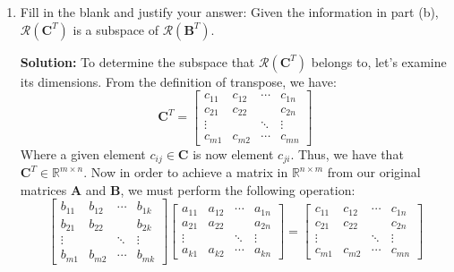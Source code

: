 \begin{enumerate}[label=(\alph*)]
	      \par Together, we have shown that $\mathcal{R}(\mathbf{C})$ is a subspace
	      of $\mathcal{R}(\mathbf{A})$. \qed

	\item Fill in the blank and justify your answer: Given the information in
	      part (b), $\mathcal{R}\left( \mathbf{C}^T \right)$ is a subspace of
	      $\mathcal{R}\left(\mathbf{B}^T \right)$.

	      \par \textbf{Solution:}
	      To determine the subspace that $\mathcal{R}\left( \mathbf{C}^T
		      \right)$ belongs to, let's examine its dimensions. From the definition
	      of transpose, we have:
	      $$
		      \mathbf{C}^T  =
		      \left[\begin{array}{cccc}
				      c_{11}  & c_{12}  & \cdots & c_{1 n} \\
				      c_{21}  & c_{22}  &        & c_{2 n} \\
				      \vdots  &         & \ddots & \vdots  \\
				      c_{m 1} & c_{m 2} & \cdots & c_{m n}
			      \end{array}\right]
	      $$
	      Where a given element $c_{ij} \in \mathbf{C}$ is now element $c_{ji}$.
	      Thus, we have that $\mathbf{C}^T \in \mathbb{R}^{m \times n}$. Now in
	      order to achieve a matrix in $\mathbb{R}^{n \times m}$ from our
	      original matrices $\mathbf{A}$ and $\mathbf{B}$, we must perform the
	      following operation:
	      $$
		      \left[\begin{array}{cccc}
				      b_{11}  & b_{12}  & \cdots & b_{1 k} \\
				      b_{21}  & b_{22}  &        & b_{2 k} \\
				      \vdots  &         & \ddots & \vdots  \\
				      b_{m 1} & b_{m 2} & \cdots & b_{m k}
			      \end{array}\right]
		      \left[\begin{array}{cccc}
				      a_{11}  & a_{12} & \cdots & a_{1 n} \\
				      a_{21}  & a_{22} &        & a_{2 n} \\
				      \vdots  &        & \ddots & \vdots  \\
				      a_{k 1} & a_{k2} & \cdots & a_{k n}
			      \end{array}\right]
		      =
		      \left[\begin{array}{cccc}
				      c_{11}  & c_{12}  & \cdots & c_{1 n} \\
				      c_{21}  & c_{22}  &        & c_{2 n} \\
				      \vdots  &         & \ddots & \vdots  \\
				      c_{m 1} & c_{m 2} & \cdots & c_{m n}
			      \end{array}\right]
	      $$


\end{enumerate}
